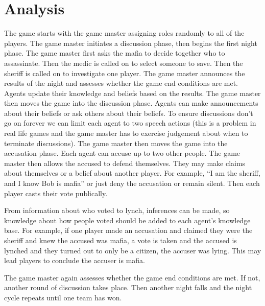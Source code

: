 \documentclass[12pt]{article} %
\begin{document}

\section{Analysis}

The game starts with the game master assigning roles randomly to all of the players. The game master initiates a discussion phase, then begins the first night phase. The game master first asks the mafia to decide together who to assassinate. Then the medic is called on to select someone to save. Then the sheriff is called on to investigate one player. The game master announces the results of the night and assesses whether the game end conditions are met. Agents update their knowledge and beliefs based on the results. The game master then moves the game into the discussion phase. Agents can make announcements about their beliefs or ask others about their beliefs. To ensure discussions don’t go on forever we can limit each agent to two speech actions (this is a problem in real life games and the game master has to exercise judgement about when to terminate discussions). The game master then moves the game into the accusation phase. Each agent can accuse up to two other people. The game master then allows the accused to defend themselves. They may make claims about themselves or a belief about another player. For example, “I am the sheriff, and I know Bob is mafia” or just deny the accusation or remain silent. Then each player casts their vote publically.

From information about who voted to lynch, inferences can be made, so knowledge about how people voted should be added to each agent’s knowledge base. For example, if one player made an accusation and claimed they were the sheriff and knew the accused was mafia, a vote is taken and the accused is lynched and they turned out to only be a citizen, the accuser was lying. This may lead players to conclude the accuser is mafia.

The game master again assesses whether the game end conditions are met. If not, another round of discussion takes place. Then another night falls and the night cycle repeats until one team has won.

\end{document}
